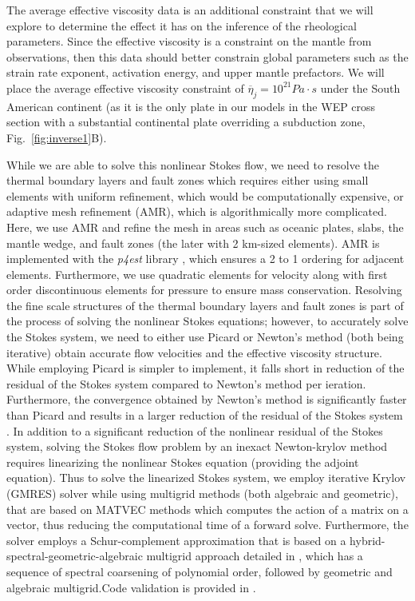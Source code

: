 \documentclass[12pt]{article}
\begin{document}
{The average effective viscosity data is an additional constraint that we will explore to determine the effect it has on the inference of the rheological parameters. Since the effective viscosity is a constraint on the mantle from observations, then this data should better constrain global parameters such as the strain rate exponent, activation energy, and upper mantle prefactors. We will place the average effective viscosity constraint of $\overline{\eta}_j = 10^{21} Pa\cdot s$ under the South American continent (as it is the only plate in our models in the WEP cross section with a substantial continental plate overriding a subduction zone, Fig.~\ref{fig:inverse1}B).
 
While we are able to solve this nonlinear Stokes flow, we need to resolve the thermal boundary layers and fault zones which requires either using small elements with uniform refinement, which would be computationally expensive, or adaptive mesh refinement (AMR), which is algorithmically more complicated. 
Here, we use AMR and refine the mesh in areas such as oceanic plates, slabs, the mantle wedge, and fault zones (the later with 2 km-sized elements). AMR is implemented with the \textit{p4est} library \citep{burstedde2011p4est}, which ensures a 2 to 1 ordering for adjacent elements. Furthermore, we use quadratic elements for velocity along with first order discontinuous elements for pressure to ensure mass conservation.
  Resolving the fine scale structures of the thermal boundary layers and fault zones is part of the process of solving the nonlinear Stokes equations; however, to accurately solve the Stokes system, we need to either use Picard or Newton's method (both being iterative) obtain accurate flow velocities and the effective viscosity structure. While employing Picard is simpler to implement, it falls short in reduction of the residual of the Stokes system compared to Newton's method per ieration. Furthermore, the convergence obtained by Newton's method is significantly faster than Picard and results in a larger reduction of the residual of the Stokes system \citep{rudi2015extreme}. In addition to a significant reduction of the nonlinear residual of the Stokes system, solving the Stokes flow problem by an inexact Newton-krylov method requires linearizing the nonlinear Stokes equation (providing the adjoint equation). Thus to solve the linearized Stokes system, we employ iterative Krylov (GMRES) solver while using multigrid methods (both algebraic and geometric), that are based on MATVEC methods which computes the action of a matrix on a vector, thus reducing the computational time of a forward solve. Furthermore, the solver employs a Schur-complement approximation that is based on a hybrid-spectral-geometric-algebraic multigrid approach detailed in \citep{rudi2015extreme}, which has a sequence of spectral coarsening of polynomial order, followed by geometric and algebraic multigrid.Code validation is provided in  \citep{rudi2015extreme}. 


}
\end{document}
